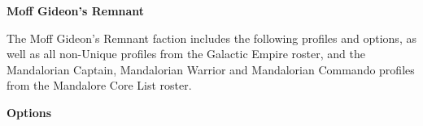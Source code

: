 \documentclass{article}
\begin{document}
\vspace{0.6cm}

{\Large \textbf{Moff Gideon's Remnant}}
\vspace{0.3cm}

\begin{minipage}{19cm}
    The Moff Gideon's Remnant faction includes the following profiles and options,
    as well as all non-Unique profiles from the Galactic Empire roster,
    and the Mandalorian Captain, Mandalorian Warrior and Mandalorian Commando
    profiles from the Mandalore Core List roster.
\end{minipage}

\vspace{0.3cm}
{\scriptsize
\setlength\extrarowheight{1.5pt}

}
\vspace{0.6cm}

{\large \textbf{Options}}
\vspace{0.3cm}
\begin{multicols}{2}
    {\scriptsize

    \setlength\extrarowheight{1.5pt}
    

    \vspace{0.6cm}

    \setlength\extrarowheight{1.5pt}
    

    \vspace{0.6cm}

    \setlength\extrarowheight{1.5pt}
    

    \vspace{0.6cm}

    \setlength\extrarowheight{1.5pt}
    

    \vspace{0.6cm}

    \setlength\extrarowheight{1.5pt}
    

    \vspace{0.6cm}

    \setlength\extrarowheight{1.5pt}
    
    }
\end{multicols}
\end{document}
